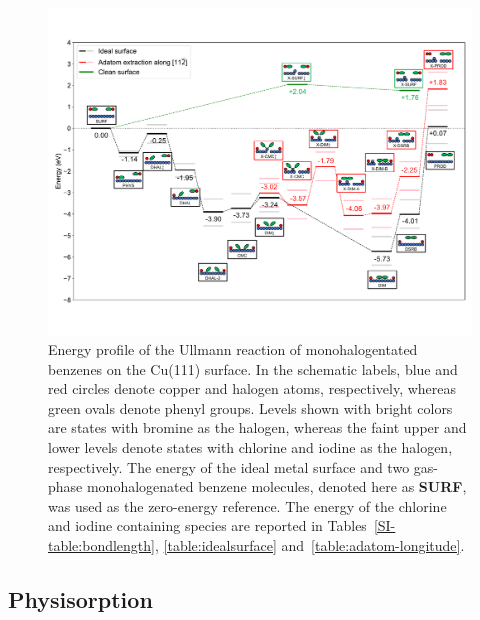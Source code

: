 \documentclass[%
 reprint,
 amsmath,amssymb,
 aps,
prb,
floatfix,
]{revtex4-2}
\newcommand{\zhzh}{\color{blue}}
\newcommand{\zhzh}{\color{blue}}
\newcommand{\comm}{\color{ForestGreen}} %
\begin{document}
\begin{figure}[hbt]
\centering
\includegraphics[width=1.\textwidth]{Fig/main-profile.pdf}
\caption{Energy profile of the Ullmann reaction of monohalogentated benzenes on the Cu(111) surface. In the schematic labels, blue and red circles denote copper and halogen atoms, respectively, whereas green ovals denote phenyl groups. Levels shown with bright colors are states with bromine as the halogen, whereas the faint upper and lower levels denote states with chlorine and iodine as the halogen, respectively. The energy of the ideal metal surface and two gas-phase monohalogenated benzene molecules, denoted here as \textbf{SURF}, was used as the zero-energy reference. The energy of the chlorine and iodine containing species are reported in Tables~\ref{SI-table:bondlength}, \ref{table:idealsurface} and~\ref{table:adatom-longitude}.
}
\label{fig:completeenergy}
\end{figure}

\ifdefined\INTERNAL
\subsection{Physisorption}
\fi
\end{document}
